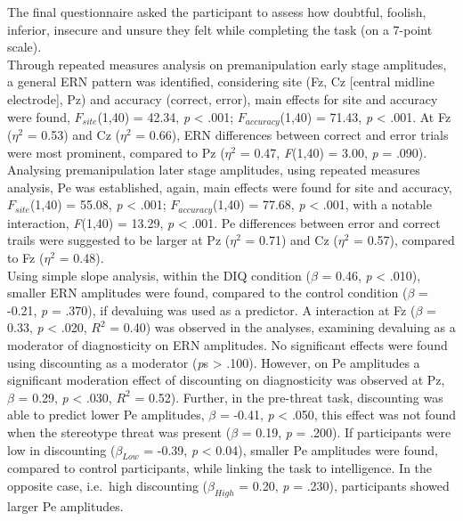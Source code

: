 \documentclass[
  stu,floatsintext]{apa7}
\begin{document}
The final questionnaire asked the participant to assess how doubtful, foolish, inferior, insecure and unsure they felt while completing the task (on a 7-point scale).\\
Through repeated measures analysis on premanipulation early stage amplitudes, a general ERN pattern was identified, considering site (Fz, Cz {[}central midline electrode{]}, Pz) and accuracy (correct, error), main effects for site and accuracy were found, \(F_{site}\)(1,40) = 42.34, \emph{p} \textless{} .001; \(F_{accuracy}\)(1,40) = 71.43, \emph{p} \textless{} .001.
At Fz (\(\eta^{2}\) = 0.53) and Cz (\(\eta^{2}\) = 0.66), ERN differences between correct and error trials were most prominent, compared to Pz (\(\eta^{2}\) = 0.47, \emph{F}(1,40) = 3.00, \emph{p} = .090).
Analysing premanipulation later stage amplitudes, using repeated measures analysis, Pe was established, again, main effects were found for site and accuracy, \(F_{site}\)(1,40) = 55.08, \emph{p} \textless{} .001; \(F_{accuracy}\)(1,40) = 77.68, \emph{p} \textless{} .001, with a notable interaction, \emph{F}(1,40) = 13.29, \emph{p} \textless{} .001.
Pe differences between error and correct trails were suggested to be larger at Pz (\(\eta^{2}\) = 0.71) and Cz (\(\eta^{2}\) = 0.57), compared to Fz (\(\eta^{2}\) = 0.48).\\
Using simple slope analysis, within the DIQ condition (\(\beta\) = 0.46, \emph{p} \textless{} .010), smaller ERN amplitudes were found, compared to the control condition (\(\beta\) = -0.21, \emph{p} = .370), if devaluing was used as a predictor.
A interaction at Fz (\(\beta\) = 0.33, \emph{p} \textless{} .020, \(R^2\) = 0.40) was observed in the analyses, examining devaluing as a moderator of diagnosticity on ERN amplitudes.
No significant effects were found using discounting as a moderator (\emph{p}s \textgreater{} .100).
However, on Pe amplitudes a significant moderation effect of discounting on diagnosticity was observed at Pz, \(\beta\) = 0.29, \emph{p} \textless{} .030, \(R^2\) = 0.52).
Further, in the pre-threat task, discounting was able to predict lower Pe amplitudes, \(\beta\) = -0.41, \emph{p} \textless{} .050, this effect was not found when the stereotype threat was present (\(\beta\) = 0.19, \emph{p} = .200).
If participants were low in discounting (\(\beta_{Low}\) = -0.39, \emph{p} \textless{} 0.04), smaller Pe amplitudes were found, compared to control participants, while linking the task to intelligence.
In the opposite case, i.e.~high discounting (\(\beta_{High}\) = 0.20, \emph{p} = .230), participants showed larger Pe amplitudes.
\end{document}
